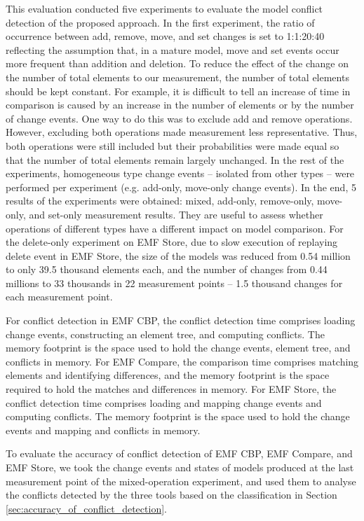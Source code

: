 This evaluation conducted five experiments to evaluate the model conflict detection of the proposed approach. In the first experiment, the ratio of occurrence between \textsf{add}, \textsf{remove}, \textsf{move}, and \textsf{set} changes is set to 1:1:20:40 reflecting the assumption that, in a mature model, \textsf{move} and \textsf{set} events occur more frequent than addition and deletion. To reduce the effect of the change on the number of total elements to our measurement, the number of total elements should be kept constant. For example, it is difficult to tell an increase of time in comparison is caused by an increase in the number of elements or by the number of change events. One way to do this was to exclude \textsf{add} and \textsf{remove} operations. However, excluding both operations made measurement less representative. Thus, both operations were still included but their probabilities were made equal so that the number of total elements remain largely unchanged. In the rest of the experiments,
homogeneous type change events -- isolated from other types -- were performed per experiment (e.g. add-only, move-only change events). In the end, 5 results of the experiments were obtained: mixed, add-only, remove-only, move-only, and set-only measurement results. They are useful to assess whether operations of different types have a different impact on model comparison. For the delete-only experiment on EMF Store, due to slow execution of replaying \textsf{delete} event in EMF Store, the size of the models was reduced from 0.54 million to only 39.5 thousand elements each, and the number of changes from 0.44 millions to 33 thousands in 22 measurement points -- 1.5 thousand changes for each measurement point.

For conflict detection in EMF CBP, the conflict detection time comprises loading change events, constructing an element tree, and computing conflicts. The memory footprint is the space used to hold the change events, element tree, and conflicts in memory. For EMF Compare, the comparison time comprises matching elements and identifying differences, and the memory footprint is the space required to hold the matches and differences in memory. For EMF Store, the conflict detection time comprises loading and mapping change events and computing conflicts. The memory footprint is the space used to hold the change events and mapping and conflicts in memory.

To evaluate the accuracy of conflict detection of EMF CBP, EMF Compare, and EMF Store, we took the change events and states of models produced at the last measurement point of the mixed-operation experiment, and used them to analyse the conflicts detected by the three tools based on the classification in Section \ref{sec:accuracy_of_conflict_detection}.

